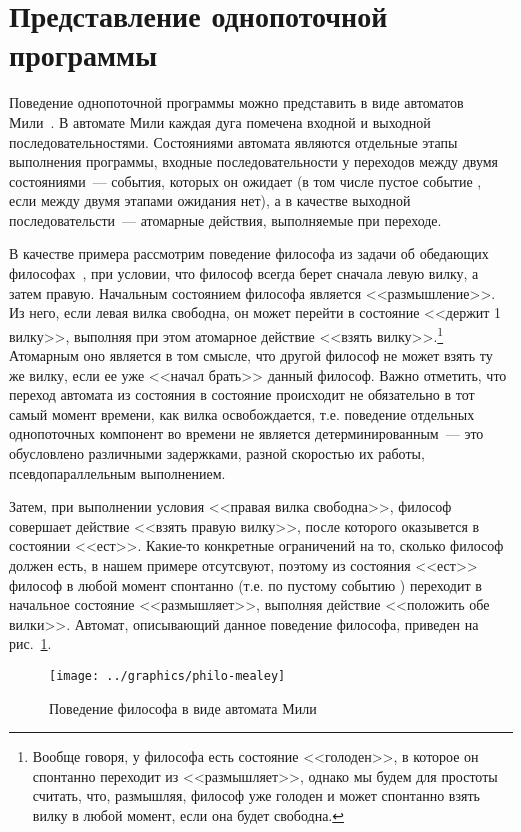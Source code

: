 \section{Представление однопоточной программы}
\label{sec:mealey-formalization}

Поведение однопоточной программы можно представить в виде автоматов Мили~\cite{Velder}. В
автомате Мили каждая дуга помечена входной и выходной последовательностями. Состояниями
автомата являются отдельные этапы выполнения программы, входные последовательности у
переходов между двумя состояниями~--- события, которых он ожидает (в том числе пустое
событие , если между двумя этапами ожидания нет), а в качестве выходной
последовательсти~--- атомарные действия, выполняемые при переходе.

В качестве примера рассмотрим поведение философа из задачи об обедающих
философах~\cite{Dijkstra}, при условии, что философ всегда берет сначала левую вилку, а
затем правую. Начальным состоянием философа является <<размышление>>. Из него, если левая
вилка свободна, он может перейти в состояние <<держит 1 вилку>>, выполняя при этом
атомарное действие <<взять вилку>>.\footnote{Вообще говоря, у философа есть состояние
  <<голоден>>, в которое он спонтанно переходит из <<размышляет>>, однако мы будем для
  простоты считать, что, размышляя, философ уже голоден и может спонтанно взять вилку в
  любой момент, если она будет свободна.} Атомарным оно является в том смысле, что другой
философ не может взять ту же вилку, если ее уже <<начал брать>> данный философ. Важно
отметить, что переход автомата из состояния в состояние происходит не обязательно в тот
самый момент времени, как вилка освобождается, т.е. поведение отдельных однопоточных
компонент во времени не является детерминированным~--- это обусловлено различными
задержками, разной скоростью их работы, псевдопараллельным выполнением\etc.

Затем, при выполнении условия <<правая вилка свободна>>, философ совершает действие
<<взять правую вилку>>, после которого оказывется в состоянии <<ест>>. Какие-то конкретные
ограничений на то, сколько философ должен есть, в нашем примере отсутсвуют, поэтому из
состояния <<ест>> философ в любой момент спонтанно (т.е. по пустому событию )
переходит в начальное состояние <<размышляет>>, выполняя действие <<положить обе
вилки>>. Автомат, описывающий данное поведение философа, приведен на рис.~\ref{fig:philo-mealey}.

\begin{figure}[ht]
  \centering
  \texttt{[image: ../graphics/philo-mealey]}
  \caption{Поведение философа в виде автомата Мили}
  \label{fig:philo-mealey}
\end{figure}

